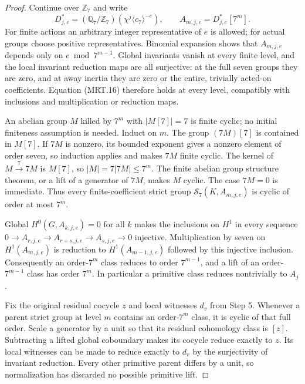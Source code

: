 \begin{proof}
Continue over $\mathbb Z_7$ and write
\[
 D_{j,e}^*=(\mathbb Q_7/\mathbb Z_7)
                    (\chi^j\langle c_7\rangle^{-e}),\qquad
 A_{m,j,e}=D_{j,e}^*[7^m].                                    \tag{MRT.32}
\]
For finite actions an arbitrary integer representative of $e$ is
allowed; for actual groups choose positive representatives.
Binomial expansion shows that $A_{m,j,e}$ depends only on
$e\bmod7^{m-1}$.  Global invariants vanish at every finite level,
and the local invariant reduction maps are all surjective: at the
full seven groups they are zero, and at away inertia they are zero
or the entire, trivially acted-on coefficients.  Equation (MRT.16)
therefore holds at every level, compatibly with inclusions and
multiplication or reduction maps.

An abelian group $M$ killed by $7^m$ with $|M[7]|=7$ is finite
cyclic; no initial finiteness assumption is needed.  Induct on $m$.
The group $(7M)[7]$ is contained in $M[7]$.  If $7M$ is nonzero,
its bounded exponent gives a nonzero element of order seven, so
induction applies and makes $7M$ finite cyclic.  The kernel of
$M\xrightarrow{7}7M$ is $M[7]$, so $|M|=7|7M|\leq7^m$.
The finite abelian group structure theorem, or a lift of a generator
of $7M$, makes $M$ cyclic.  The case $7M=0$ is immediate.
Thus every finite-coefficient strict group
$\mathcal S_7(K,A_{m,j,e})$ is cyclic of order at most $7^m$.

Global $H^0(G,A_{k,j,e})=0$ for all $k$ makes the inclusions on
$H^1$ in every sequence
$0\to A_{r,j,e}\to A_{r+s,j,e}\to A_{s,j,e}\to0$ injective.
Multiplication by seven on $H^1(A_{m,j,e})$ is reduction to
$H^1(A_{m-1,j,e})$ followed by this injective inclusion.
Consequently an order-$7^m$ class reduces to order $7^{m-1}$,
and a lift of an order-$7^{m-1}$ class has order $7^m$.
In particular a primitive class reduces nontrivially to $A_j$.

Fix the original residual cocycle $z$ and local witnesses $d_v$
from Step 5.  Whenever a parent strict group at level $m$ contains
an order-$7^m$ class, it is cyclic of that full order.
Scale a generator by a unit so that its residual cohomology class
is $[z]$.  Subtracting a lifted global coboundary makes its cocycle
reduce exactly to $z$.  Its local witnesses can be made to reduce
exactly to $d_v$ by the surjectivity of invariant reduction.
Every other primitive parent differs by a unit, so normalization
has discarded no possible primitive lift.


\end{proof}
